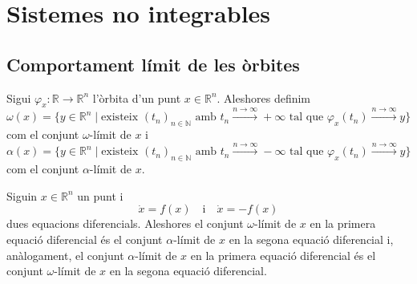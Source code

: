 \documentclass[../../main.tex]{subfiles}
\begin{document}
\section{Sistemes no integrables}
    \subsection{Comportament límit de les òrbites} %
    \begin{definition}
        \label{def:conjunt-omega-limit}
        \label{def:conjunt-alpha-limit}
        Sigui \(\varphi_{x}\colon\mathbb{R}\longrightarrow\mathbb{R}^{n}\) l'òrbita d'un punt \(x\in\mathbb{R}^{n}\).
        Aleshores definim
        \[
            \omega(x)=\{y\in\mathbb{R}^{n}\mid\text{existeix }(t_{n})_{n\in\mathbb{N}}\text{ amb }t_{n}\overset{n\to\infty}{\longrightarrow}+\infty\text{ tal que }\varphi_{x}(t_{n})\overset{n\to\infty}{\longrightarrow}y\}
        \]
        com el conjunt \(\omega\)-límit de \(x\) i
        \[
            \alpha(x)=\{y\in\mathbb{R}^{n}\mid\text{existeix }(t_{n})_{n\in\mathbb{N}}\text{ amb }t_{n}\overset{n\to\infty}{\longrightarrow}-\infty\text{ tal que }\varphi_{x}(t_{n})\overset{n\to\infty}{\longrightarrow}y\}
        \]
        com el conjunt \(\alpha\)-límit de \(x\).
    \end{definition}
    \begin{observation}
        Siguin \(x\in\mathbb{R}^{n}\) un punt i
        \[
            \dot{x}=f(x)\quad\text{i}\quad\dot{x}=-f(x)
        \]
        dues equacions diferencials.
        Aleshores el conjunt \(\omega\)-límit de \(x\) en la primera equació diferencial és el conjunt \(\alpha\)-límit de \(x\) en la segona equació diferencial i, anàlogament, el conjunt \(\alpha\)-límit de \(x\) en la primera equació diferencial és el conjunt \(\omega\)-límit de \(x\) en la segona equació diferencial.
    \end{observation}
\end{document}
